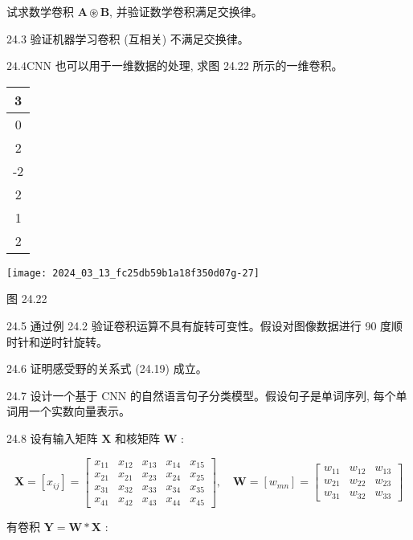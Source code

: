 \documentclass[10pt]{article}
\begin{document}
试求数学卷积 $\boldsymbol{A} \circledast \boldsymbol{B}$, 并验证数学卷积满足交换律。

24.3 验证机器学习卷积 (互相关) 不满足交换律。

$24.4 \mathrm{CNN}$ 也可以用于一维数据的处理, 求图 24.22 所示的一维卷积。

\begin{center}
\begin{tabular}{|c|}
\hline
3 \\
\hline
0 \\
\hline
2 \\
\hline
-2 \\
\hline
2 \\
\hline
1 \\
\hline
2 \\
\hline
\end{tabular}
\end{center}

\begin{center}
\texttt{[image: 2024\_03\_13\_fc25db59b1a18f350d07g-27]}
\end{center}

图 24.22

24.5 通过例 24.2 验证卷积运算不具有旋转可变性。假设对图像数据进行 90 度顺时针和逆时针旋转。

24.6 证明感受野的关系式 (24.19) 成立。

24.7 设计一个基于 CNN 的自然语言句子分类模型。假设句子是单词序列, 每个单词用一个实数向量表示。

24.8 设有输入矩阵 $\boldsymbol{X}$ 和核矩阵 $\boldsymbol{W}$ :

$$
\boldsymbol{X}=\left[x_{i j}\right]=\left[\begin{array}{ccccc}
x_{11} & x_{12} & x_{13} & x_{14} & x_{15} \\
x_{21} & x_{21} & x_{23} & x_{24} & x_{25} \\
x_{31} & x_{32} & x_{33} & x_{34} & x_{35} \\
x_{41} & x_{42} & x_{43} & x_{44} & x_{45}
\end{array}\right], \quad \boldsymbol{W}=\left[w_{m n}\right]=\left[\begin{array}{ccc}
w_{11} & w_{12} & w_{13} \\
w_{21} & w_{22} & w_{23} \\
w_{31} & w_{32} & w_{33}
\end{array}\right]
$$

有卷积 $\boldsymbol{Y}=\boldsymbol{W} * \boldsymbol{X}$ :
\end{document}
